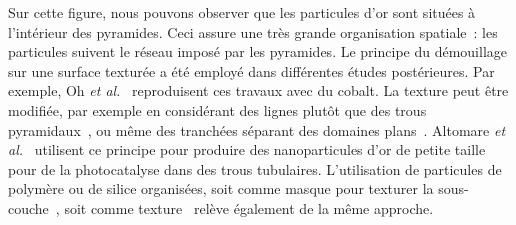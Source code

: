 Sur cette figure, nous pouvons observer que les particules d'or sont situées à l'intérieur des pyramides. Ceci assure une très grande organisation spatiale~: les particules suivent le réseau imposé par les pyramides. Le principe du démouillage sur une surface texturée a été employé dans différentes études postérieures. Par exemple, Oh \textit{et al.}~\cite{oh2009cobalt} reproduisent ces travaux avec du cobalt. La texture peut être modifiée, par exemple en considérant des lignes plutôt que des trous pyramidaux~\cite{petersen2008dewetting}, ou même des tranchées séparant des domaines plans~\cite{yoshino2012effects}. Altomare \textit{et al.}~\cite{altomare2016templated} utilisent ce principe pour produire des nanoparticules d'or de petite taille pour de la photocatalyse dans des trous tubulaires. L'utilisation de particules de polymère ou de silice organisées, soit comme masque pour texturer la sous-couche~\cite{yang2011template}, soit comme texture~\cite{wang2016thermal} relève également de la même approche.\par 

